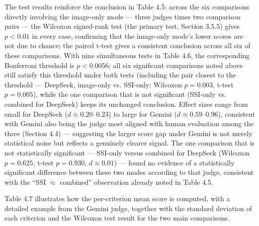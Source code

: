 \documentclass[12pt,a4paper]{report}
\begin{document}
The test results reinforce the conclusion in Table 4.5: across the six comparisons directly involving the image-only mode --- three judges times two comparison pairs --- the Wilcoxon signed-rank test (the primary test, Section 3.5.5) gives $p < 0.01$ in every case, confirming that the image-only mode's lower scores are not due to chance; the paired t-test gives a consistent conclusion across all six of these comparisons. With nine simultaneous tests in Table 4.6, the corresponding Bonferroni threshold is $p < 0.0056$; all six significant comparisons noted above still satisfy this threshold under both tests (including the pair closest to the threshold --- DeepSeek, image-only vs. SSI-only: Wilcoxon $p = 0.003$, t-test $p = 0.005$), while the one comparison that is not significant (SSI-only vs. combined for DeepSeek) keeps its unchanged conclusion. Effect sizes range from small for DeepSeek ($d \approx 0.20$--$0.23$) to large for Gemini ($d \approx 0.59$--$0.96$), consistent with Gemini also being the judge most aligned with human evaluation among the three (Section 4.4) --- suggesting the larger score gap under Gemini is not merely statistical noise but reflects a genuinely clearer signal. The one comparison that is not statistically significant --- SSI-only versus combined for DeepSeek (Wilcoxon $p = 0.625$, t-test $p = 0.930$, $d \approx 0.01$) --- found no evidence of a statistically significant difference between these two modes according to that judge, consistent with the ``SSI $\approx$ combined'' observation already noted in Table 4.5.

Table 4.7 illustrates how the per-criterion mean score is computed, with a detailed example from the Gemini judge, together with the standard deviation of each criterion and the Wilcoxon test result for the two main comparisons.
\end{document}
